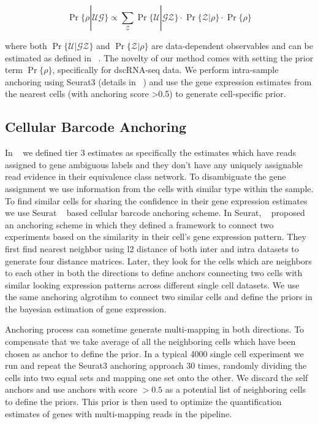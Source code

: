 \begin{equation}
	\Pr \{ \rho | \mathcal{U} \mathcal{G} \} 
	\propto \sum_{\mathcal{Z}} \Pr\{ \mathcal{U} | \mathcal{G} \mathcal{Z} \}
	\cdot \Pr\{ \mathcal{Z} | \rho \} \cdot \Pr\{ \rho \}
\end{equation}

where both $\Pr\{ \mathcal{U} | \mathcal{G} \mathcal{Z} \}$ and $\Pr\{ \mathcal{Z} | \rho \}$ are 
data-dependent observables and can be estimated as defined in ~\citet{salmon}. The novelty of our method
comes with setting the prior term $\Pr\{ \rho \}$, specifically for dscRNA-seq data. We perform
intra-sample anchoring using Seurat3 (details in ~) and use the gene expression
estimates from the nearest cells (with anchoring score >0.5) to generate cell-specific prior.

\subsection{Cellular Barcode Anchoring}
\label{subsec:anchor}
In ~ we defined tier 3 estimates as specifically the estimates which have reads assigned 
to gene ambiguous labels and they don't have any uniquely assignable read evidence in their equivalence 
class network. To disambiguate the gene assignment we use 
information from the cells with similar type within the sample. To find similar cells for sharing 
the confidence in their gene expression estimates we use Seurat ~\citep{seurat3} based cellular
barcode anchoring scheme. In Seurat, ~\citet{seurat3} proposed an anchoring scheme in which they 
defined a framework to connect two experiments based on the similarity in their cell's gene expression 
pattern. They first find nearest neighbor using l2 distance of both inter and intra datasets to generate 
four distance matrices. Later, they look for the cells which are neighbors to each other in both 
the directions to define anchors connecting two cells with similar looking expression patterns 
across different single cell datasets. We use the same anchoring algrotihm to connect two similar 
cells and define the priors in the bayesian estimation of gene expression.

Anchoring process can sometime generate multi-mapping in both directions. To compensate that we take average 
of all the neighboring cells which have been chosen as anchor to define the prior. In a typical 4000 single 
cell experiment we run \alevin and repeat the Seurat3 anchoring approach $30$ times, randomly dividing 
the cells into two equal sets and mapping one set onto the other. We discard the self anchors and use 
anchors with score $>0.5$ as a potential list of neighboring cells to define the priors. This prior 
is then used to optimize the quantification estimates of genes with multi-mapping reads in the \alevin 
pipeline.

